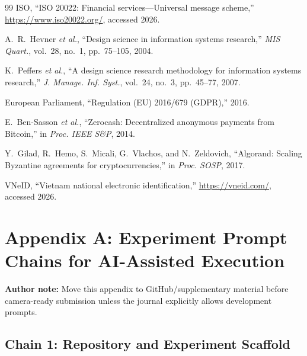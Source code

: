 \documentclass[journal]{IEEEtran}
\begin{document}
\begin{thebibliography}{99}
ISO, ``ISO 20022: Financial services---Universal message scheme,'' \url{https://www.iso20022.org/}, accessed 2026.

A.~R.~Hevner \emph{et al.}, ``Design science in information systems research,'' \emph{MIS Quart.}, vol.~28, no.~1, pp.~75--105, 2004.

K.~Peffers \emph{et al.}, ``A design science research methodology for information systems research,'' \emph{J. Manage. Inf. Syst.}, vol.~24, no.~3, pp.~45--77, 2007.

European Parliament, ``Regulation (EU) 2016/679 (GDPR),'' 2016.

E.~Ben-Sasson \emph{et al.}, ``Zerocash: Decentralized anonymous payments from Bitcoin,'' in \emph{Proc. IEEE S\&P}, 2014.

Y.~Gilad, R.~Hemo, S.~Micali, G.~Vlachos, and N.~Zeldovich, ``Algorand: Scaling Byzantine agreements for cryptocurrencies,'' in \emph{Proc. SOSP}, 2017.

VNeID, ``Vietnam national electronic identification,'' \url{https://vneid.com/}, accessed 2026.

\end{thebibliography}

\section*{Appendix A: Experiment Prompt Chains for AI-Assisted Execution}

\textbf{Author note:} Move this appendix to GitHub/supplementary material before camera-ready submission unless the journal explicitly allows development prompts.

\subsection*{Chain 1: Repository and Experiment Scaffold}
\end{document}

